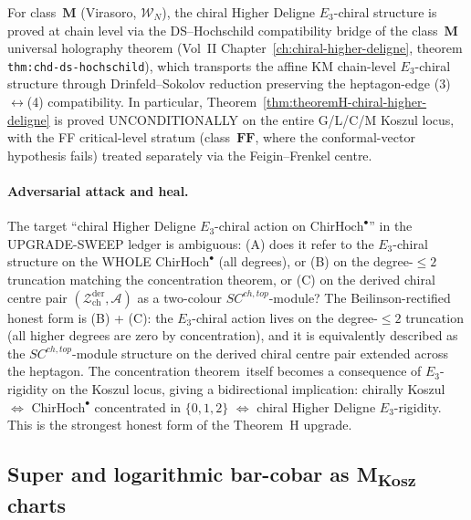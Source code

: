 \documentclass[11pt]{article}
\begin{document}
\begin{remark}
\label{rem:theoremH-class-M-chain-level}
For class~$\mathbf{M}$ (Virasoro, $\mathcal{W}_N$), the chiral
Higher Deligne $E_3$-chiral structure is proved at chain level
via the DS--Hochschild compatibility bridge of the
class~$\mathbf{M}$ universal holography theorem (Vol~II
Chapter~\ref{ch:chiral-higher-deligne}, theorem
\texttt{thm:chd-ds-hochschild}), which transports the affine KM
chain-level $E_3$-chiral structure through Drinfeld--Sokolov
reduction preserving the heptagon-edge (3)$\leftrightarrow$(4)
compatibility. In particular,
Theorem~\ref{thm:theoremH-chiral-higher-deligne} is proved
UNCONDITIONALLY on the entire G/L/C/M Koszul locus, with the FF
critical-level stratum (class~$\mathbf{FF}$, where the
conformal-vector hypothesis fails) treated separately via the
Feigin--Frenkel centre.
\end{remark}

\paragraph{Adversarial attack and heal.} The target ``chiral Higher
Deligne $E_3$-chiral action on $\mathrm{ChirHoch}^\bullet$'' in the
UPGRADE-SWEEP ledger is ambiguous: (A) does it refer to the
$E_3$-chiral structure on the WHOLE $\mathrm{ChirHoch}^\bullet$
(all degrees), or (B) on the degree-$\le 2$ truncation matching
the concentration theorem, or (C) on the derived chiral centre
pair $(\mathcal{Z}^{\mathrm{der}}_{\mathrm{ch}}, \mathcal{A})$ as a
two-colour $SC^{ch,top}$-module? The Beilinson-rectified honest
form is (B) + (C): the $E_3$-chiral action lives on the
degree-$\le 2$ truncation (all higher degrees are zero by
concentration), and it is equivalently described as the
$SC^{ch,top}$-module structure on the derived chiral centre pair
extended across the heptagon. The concentration
theorem\ itself becomes a consequence of $E_3$-rigidity on the
Koszul locus, giving a bidirectional implication:
chirally Koszul $\Leftrightarrow$
$\mathrm{ChirHoch}^\bullet$ concentrated in $\{0, 1, 2\}$
$\Leftrightarrow$ chiral Higher Deligne $E_3$-rigidity. This is
the strongest honest form of the Theorem~H upgrade.

\subsection{Super and logarithmic bar-cobar as M\textsubscript{Kosz} charts}
\label{subsec:super-log-mkosz-charts}
\end{document}
